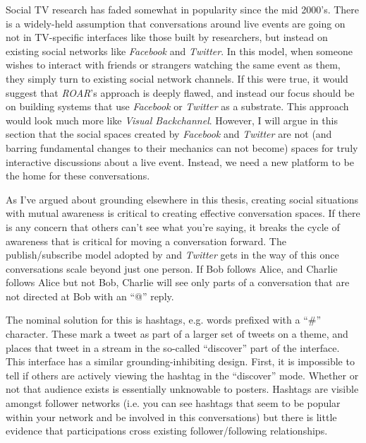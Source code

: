 Social TV research has faded somewhat in popularity since the mid 2000's.  There is a widely-held assumption that conversations around live events are going on not in TV-specific interfaces like those built by researchers, but instead on existing social networks like \emph{Facebook} and \emph{Twitter}. In this model, when someone wishes to interact with friends or strangers watching the same event as them, they simply turn to existing social network channels. If this were true, it would suggest that \emph{ROAR}'s approach is deeply flawed, and instead our focus should be on building systems that use \emph{Facebook} or \emph{Twitter} as a substrate. This approach would look much more like \emph{Visual Backchannel}\citep{Dork:2010fb}. However, I will argue in this section that the social spaces created by \emph{Facebook} and \emph{Twitter} are not (and barring fundamental changes to their mechanics can not become) spaces for truly interactive discussions about a live event. Instead, we need a new platform to be the home for these conversations.

As I've argued about grounding elsewhere in this thesis, creating social situations with mutual awareness is critical to creating effective conversation spaces. If there is any concern that others can't see what you're saying, it breaks the cycle of awareness that is critical for moving a conversation forward. The publish/subscribe model adopted by and \emph{Twitter} gets in the way of this once conversations scale beyond just one person. If Bob follows Alice, and Charlie follows Alice but not Bob, Charlie will see only parts of a conversation that are not directed at Bob with an ``@'' reply. 

The nominal solution for this is hashtags, e.g. words prefixed with a ``\#'' character. These mark a tweet as part of a larger set of tweets on a theme, and places that tweet in a stream in the so-called ``discover'' part of the interface. This interface has a similar grounding-inhibiting design. First, it is impossible to tell if others are actively viewing the hashtag in the ``discover'' mode. Whether or not that audience exists is essentially unknowable to posters. Hashtags are visible amongst follower networks (i.e. you can see hashtags that seem to be popular within your network and be involved in this conversations) but there is little evidence that participations cross existing follower/following relationships.

